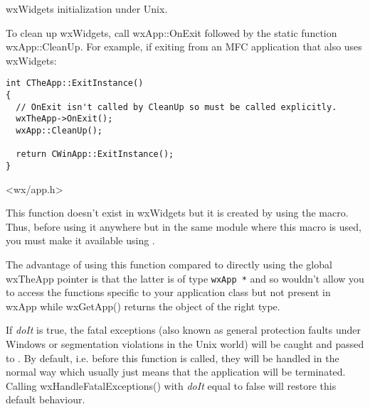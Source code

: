 wxWidgets initialization under Unix.


To clean up wxWidgets, call wxApp::OnExit followed by the static function
wxApp::CleanUp. For example, if exiting from an MFC application that also uses wxWidgets:

\begin{verbatim}
int CTheApp::ExitInstance()
{
  // OnExit isn't called by CleanUp so must be called explicitly.
  wxTheApp->OnExit();
  wxApp::CleanUp();

  return CWinApp::ExitInstance();
}
\end{verbatim}


<wx/app.h>



\label{wxgetapp}


This function doesn't exist in wxWidgets but it is created by using
the  macro. Thus, before using it
anywhere but in the same module where this macro is used, you must make it
available using .

The advantage of using this function compared to directly using the global
wxTheApp pointer is that the latter is of type {\tt wxApp *} and so wouldn't
allow you to access the functions specific to your application class but not
present in wxApp while wxGetApp() returns the object of the right type.


\label{wxhandlefatalexceptions}


If {\it doIt} is true, the fatal exceptions (also known as general protection
faults under Windows or segmentation violations in the Unix world) will be
caught and passed to .
By default, i.e. before this function is called, they will be handled in the
normal way which usually just means that the application will be terminated.
Calling wxHandleFatalExceptions() with {\it doIt} equal to false will restore
this default behaviour.


\label{wxinitallimagehandlers}


